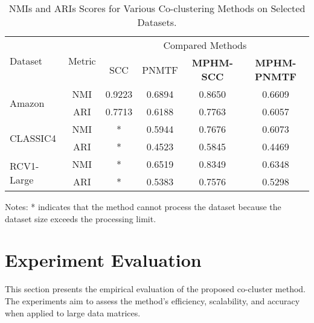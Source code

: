 \begin{table*}[htbp]
    \centering
    \caption{NMIs and ARIs Scores for Various Co-clustering Methods on Selected Datasets.}
    \label{tab:evaluation-metrics}
    \begin{tabular}{@{} l c cccc @{}}
        \toprule
        \multirow{2}{*}{Dataset}    & \multirow{2}{*}{Metric} & \multicolumn{4}{c}{Compared Methods}                                                         \\
        \cmidrule{3-6}
                                    &                         & SCC \cite{dhillon2001CoclusteringDocumentsWords}                                    & PNMTF \cite{chen2023ParallelNonNegativeMatrix}  & \textbf{MPHM-SCC} & \textbf{MPHM-PNMTF} \\
        \midrule
        \multirow{2}{*}{Amazon}     & NMI                     & 0.9223                                      & 0.6894 & 0.8650          & 0.6609            \\
                                    & ARI                     & 0.7713                                      & 0.6188 & 0.7763          & 0.6057            \\
        \multirow{2}{*}{CLASSIC4}   & NMI                     & *                                            & 0.5944 & 0.7676          & 0.6073            \\
                                    & ARI                     & *                                            & 0.4523 & 0.5845          & 0.4469            \\
        \multirow{2}{*}{RCV1-Large} & NMI                     & *                                            & 0.6519 & 0.8349          & 0.6348            \\
                                    & ARI                     & *                                            & 0.5383 & 0.7576          & 0.5298            \\
        \bottomrule
    \end{tabular}
    \begin{tablenotes}
        \small
        \item Notes: * indicates that the method cannot process the dataset because the dataset size exceeds the processing limit.
    \end{tablenotes}
\end{table*}
\section{Experiment Evaluation}
\label{sec:experiment}
This section presents the empirical evaluation of the proposed co-cluster method. The experiments aim to assess the method's efficiency, scalability, and accuracy when applied to large data matrices.

